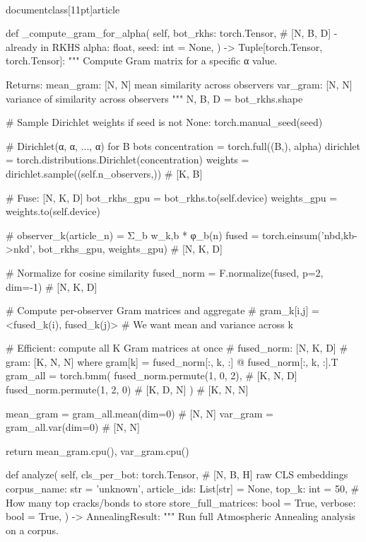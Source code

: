 \\documentclass[11pt]{article}
\begin{document}
\begin{CodeBlock}
{{{{{{{{    def _compute_gram_for_alpha(
        self,
        bot_rkhs: torch.Tensor,  # [N, B, D] - already in RKHS
        alpha: float,
        seed: int = None,
    ) -> Tuple[torch.Tensor, torch.Tensor]:
        """
        Compute Gram matrix for a specific α value.
        
        Returns:
            mean_gram: [N, N] mean similarity across observers
            var_gram: [N, N] variance of similarity across observers
        """
        N, B, D = bot_rkhs.shape
        
        # Sample Dirichlet weights
        if seed is not None:
            torch.manual_seed(seed)
        
        # Dirichlet(α, α, ..., α) for B bots
        concentration = torch.full((B,), alpha)
        dirichlet = torch.distributions.Dirichlet(concentration)
        weights = dirichlet.sample((self.n_observers,))  # [K, B]
        
        # Fuse: [N, K, D]
        bot_rkhs_gpu = bot_rkhs.to(self.device)
        weights_gpu = weights.to(self.device)
        
        # observer_k(article_n) = Σ_b w_{k,b} * φ_b(n)
        fused = torch.einsum('nbd,kb->nkd', bot_rkhs_gpu, weights_gpu)  # [N, K, D]
        
        # Normalize for cosine similarity
        fused_norm = F.normalize(fused, p=2, dim=-1)  # [N, K, D]
        
        # Compute per-observer Gram matrices and aggregate
        # gram_k[i,j] = <fused_k(i), fused_k(j)>
        # We want mean and variance across k
        
        # Efficient: compute all K Gram matrices at once
        # fused_norm: [N, K, D]
        # gram: [K, N, N] where gram[k] = fused_norm[:, k, :] @ fused_norm[:, k, :].T
        gram_all = torch.bmm(
            fused_norm.permute(1, 0, 2),  # [K, N, D]
            fused_norm.permute(1, 2, 0)   # [K, D, N]
        )  # [K, N, N]
        
        mean_gram = gram_all.mean(dim=0)  # [N, N]
        var_gram = gram_all.var(dim=0)    # [N, N]
        
        return mean_gram.cpu(), var_gram.cpu()
    
    def analyze(
        self,
        cls_per_bot: torch.Tensor,  # [N, B, H] raw CLS embeddings
        corpus_name: str = 'unknown',
        article_ids: List[str] = None,
        top_k: int = 50,  # How many top cracks/bonds to store
        store_full_matrices: bool = True,
        verbose: bool = True,
    ) -> AnnealingResult:
        """
        Run full Atmospheric Annealing analysis on a corpus.
        
}}}}}}}}
\end{CodeBlock}
\end{document}
